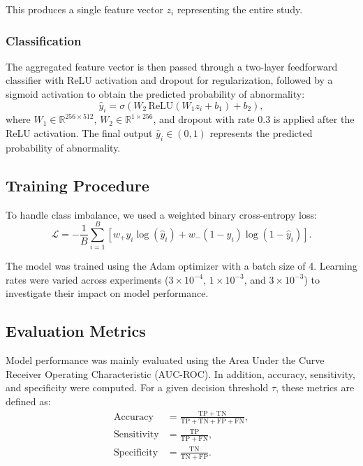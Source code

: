 \documentclass[12pt,a4paper]{article}
\begin{document}
This produces a single feature vector $z_i$ representing the entire study.

\subsubsection{Classification}

The aggregated feature vector is then passed through a two-layer feedforward classifier with ReLU activation and dropout for regularization, followed by a sigmoid activation to obtain the predicted probability of abnormality:
\begin{equation}
\hat{y}_i = \sigma(W_2 \, \text{ReLU}(W_1 z_i + b_1) + b_2),
\end{equation}
where $W_1 \in \mathbb{R}^{256 \times 512}$, $W_2 \in \mathbb{R}^{1 \times 256}$, and dropout with rate 0.3 is applied after the ReLU activation. The final output $\hat{y}_i \in (0,1)$ represents the predicted probability of abnormality.

\subsection{Training Procedure}

To handle class imbalance, we used a weighted binary cross-entropy loss:
\begin{equation}
\mathcal{L} =
- \frac{1}{B} \sum_{i=1}^{B}
\left[
w_{+} y_i \log(\hat{y}_i)
+
w_{-} (1 - y_i) \log(1 - \hat{y}_i)
\right].
\end{equation}

The model was trained using the Adam optimizer\cite{kingma_adam_2017} with a batch size of 4. Learning rates were varied across experiments ($3 \times 10^{-4}$, $1 \times 10^{-3}$, and $3 \times 10^{-3}$) to investigate their impact on model performance.

\subsection{Evaluation Metrics}

Model performance was mainly evaluated using the Area Under the Curve Receiver Operating Characteristic (AUC-ROC). In addition, accuracy, sensitivity, and specificity were computed. For a given decision threshold $\tau$, these metrics are defined as:
\begin{align}
\text{Accuracy} &= \frac{\mathrm{TP} + \mathrm{TN}}{\mathrm{TP} + \mathrm{TN} + \mathrm{FP} + \mathrm{FN}}, \\
\text{Sensitivity} &= \frac{\mathrm{TP}}{\mathrm{TP} + \mathrm{FN}}, \\
\text{Specificity} &= \frac{\mathrm{TN}}{\mathrm{TN} + \mathrm{FP}}.
\end{align}
\end{document}
